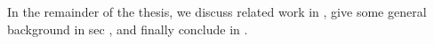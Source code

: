 In the remainder of the thesis, we discuss related work in , give some general background in sec , and finally conclude in .

